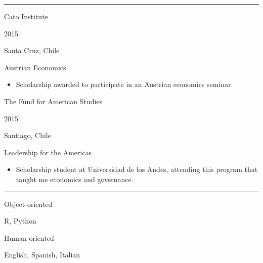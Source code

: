 \documentclass[a4paper,10pt]{article}
\newlength{\cvcolumngapwidth}
\newlength{\cvleftcolumnwidth}
\newlength{\cvrightcolumnwidth}
\newcommand{\cvsectionstyle}[1]{{\normalsize\cvsectionfont\textcolor{cvsectioncolor}{#1}}}
\newcommand{\cvtitlestyle}[1]{{\large\cvtitlefont\textcolor{cvtitlecolor}{#1}}}
\newcommand{\cvdurationstyle}[1]{{\small\cvdurationfont\textcolor{cvdurationcolor}{#1}}}
\newcommand{\cvheadingstyle}[1]{{\normalsize\cvheadingfont\textcolor{cvheadingcolor}{#1}}}
\newlength{\cvafteritemskipamount}
\newlength{\cvaftersectionskipamount}
\newlength{\cvbetweensectionandheadingextraskipamount}
\newlength{\cvaftertitleskipamount}
\newlength{\cvparskip}
\newcommand{\cvsection}[1]{
    \begin{minipage}[t]{\cvleftcolumnwidth}
        \raggedleft\cvsectionstyle{#1}
    \end{minipage}%
    \hspace{\cvcolumngapwidth}%
    \begin{minipage}[t]{\cvrightcolumnwidth}
        \textcolor{cvrulecolor}{\rule{\cvrightcolumnwidth}{0.3mm}}
    \end{minipage}

    \vspace{\cvaftersectionskipamount}
}
\newcommand{\cvitem}[2]{
    \begin{minipage}[t]{\cvleftcolumnwidth}
        \raggedleft #1
    \end{minipage}%
    \hspace{\cvcolumngapwidth}%
    \begin{minipage}[t]{\cvrightcolumnwidth}
        \setlength{\parskip}{\cvparskip} #2
    \end{minipage}

    \vspace{\cvafteritemskipamount}
}
\newcommand{\cvtitle}[1]{
    \cvtitlestyle{#1}

    \vspace{\cvaftertitleskipamount}
    \vspace{-\cvparskip}
}
\begin{document}

\cvsection{SEMINARS}

\vspace{\cvbetweensectionandheadingextraskipamount}

\cvitem{
    \cvheadingstyle{Cato Institute}

    \cvdurationstyle{2015}

    \cvdurationstyle{Santa Cruz, Chile}

}{
    \cvtitle{Austrian Economics}
    \begin{itemize}[leftmargin=*]
        \item Scholarship awarded to participate in an Austrian economics seminar.
    \end{itemize}

}

\cvitem{
    \cvheadingstyle{The Fund for American Studies}

    \cvdurationstyle{2015}

    \cvdurationstyle{Santiago, Chile}

}{
    \cvtitle{Leadership for the Americas}
    \begin{itemize}[leftmargin=*]
        \item Scholarship student at Universidad de los Andes, attending this program that taught me economics and governance.
    \end{itemize}

}


\cvsection{LANGUAGES}

\vspace{\cvbetweensectionandheadingextraskipamount}


\cvitem{
    \cvheadingstyle{Object-oriented}
}{
    R, Python
}

\cvitem{
    \cvheadingstyle{Human-oriented}
}{
    English, Spanish, Italian
}
\end{document}
